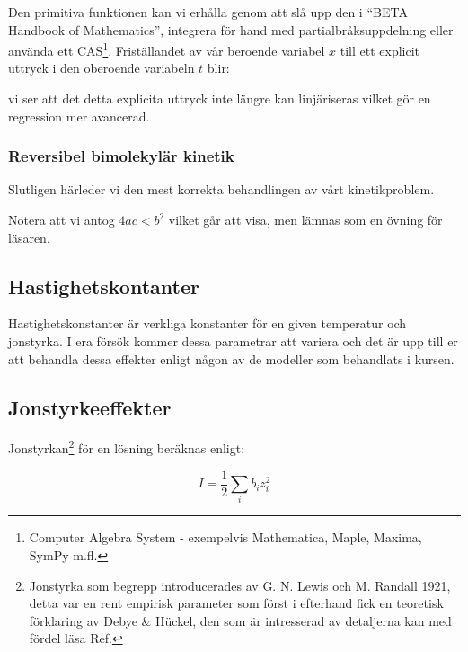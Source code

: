 

Den primitiva funktionen kan vi erhålla genom att slå upp den i ``BETA Handbook of
Mathematics'', integrera för hand med partialbråksuppdelning eller
använda ett CAS\footnote{  Computer Algebra System -   exempelvis
  Mathematica, Maple, Maxima, SymPy m.fl.}. Friställandet av vår beroende
variabel $x$ till ett explicit uttryck i den oberoende variabeln $t$
blir:



vi ser att det detta explicita uttryck inte längre kan linjäriseras
vilket gör en regression mer avancerad.

\subsubsection{Reversibel bimolekylär kinetik}
Slutligen härleder vi den mest korrekta behandlingen av vårt kinetikproblem.
\label{sec:rev_binary}




Notera att vi antog $4ac < b^2$ vilket går att visa, men lämnas som en
övning för läsaren.


\subsection{Hastighetskontanter}
Hastighetskonstanter är verkliga konstanter för en given temperatur och
jonstyrka. I era försök kommer dessa parametrar att variera och det är
upp till er att behandla dessa effekter enligt någon av de modeller som
behandlats i kursen.

\subsection{Jonstyrkeeffekter}
Jonstyrkan\footnote{Jonstyrka som begrepp introducerades av
  G. N. Lewis och M. Randall 1921, detta var en rent empirisk parameter
  som först i efterhand fick en teoretisk förklaring av Debye \&
  H\"uckel, den som är intresserad av detaljerna kan med fördel läsa
  Ref.\cite{sastre_de_vicente_concept_2004}
} för en lösning beräknas enligt:

\begin{equation}
  \label{eq:ionic-strength}
  I = \frac{1}{2}\sum_i b_iz_i^2
\end{equation}

